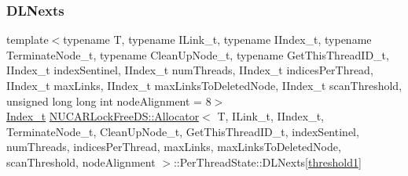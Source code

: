 \mbox{\label{class_n_u_c_a_r_lock_free_d_s_1_1_allocator_1_1_per_thread_state_acda67994c55201445540612f40ce4381}} 
\subsubsection{\texorpdfstring{D\+L\+Nexts}{DLNexts}}
{\footnotesize\ttfamily template$<$typename T, typename I\+Link\+\_\+t, typename I\+Index\+\_\+t, typename Terminate\+Node\+\_\+t, typename Clean\+Up\+Node\+\_\+t, typename Get\+This\+Thread\+I\+D\+\_\+t, I\+Index\+\_\+t index\+Sentinel, I\+Index\+\_\+t num\+Threads, I\+Index\+\_\+t indices\+Per\+Thread, I\+Index\+\_\+t max\+Links, I\+Index\+\_\+t max\+Links\+To\+Deleted\+Node, I\+Index\+\_\+t scan\+Threshold, unsigned long long int node\+Alignment = 8$>$ \\
\mbox{\hyperlink{class_n_u_c_a_r_lock_free_d_s_1_1_allocator_a2776cca35e8343bf5007bd8b6f3a3f8f}{Index\+\_\+t}} \mbox{\hyperlink{class_n_u_c_a_r_lock_free_d_s_1_1_allocator}{N\+U\+C\+A\+R\+Lock\+Free\+D\+S\+::\+Allocator}}$<$ T, I\+Link\+\_\+t, I\+Index\+\_\+t, Terminate\+Node\+\_\+t, Clean\+Up\+Node\+\_\+t, Get\+This\+Thread\+I\+D\+\_\+t, index\+Sentinel, num\+Threads, indices\+Per\+Thread, max\+Links, max\+Links\+To\+Deleted\+Node, scan\+Threshold, node\+Alignment $>$\+::Per\+Thread\+State\+::\+D\+L\+Nexts\mbox{[}\mbox{\hyperlink{class_n_u_c_a_r_lock_free_d_s_1_1_allocator_a1d220e1cc963fc9fb37e46a416504715}{threshold1}}\mbox{]}}

\mbox{\label{class_n_u_c_a_r_lock_free_d_s_1_1_allocator_1_1_per_thread_state_a034074390f23263717fea75eb0b814b5}} 
